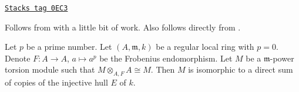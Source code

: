 \begin{lemma}
\label{local-cohomology-lemma-structure-torsion-Frobenius-regular}
\href{https://stacks.math.columbia.edu/tag/0EC3}{\texttt{Stacks tag 0EC3}}

\begin{reference}
Follows from \cite[Corollary 3.6]{Huneke-Sharp} with a
little bit of work. Also follows directly from
\cite[Theorem 1.4]{Lyubeznik2}.
\end{reference}
Let $p$ be a prime number. Let $(A, \mathfrak m, k)$
be a regular local ring with $p = 0$. Denote $F : A \to A$, $a \mapsto a^p$
be the Frobenius endomorphism. Let $M$ be a $\mathfrak m$-power torsion module
such that $M \otimes_{A, F} A \cong M$. Then $M$ is isomorphic to a direct sum
of copies of the injective hull $E$ of $k$.
\end{lemma}

